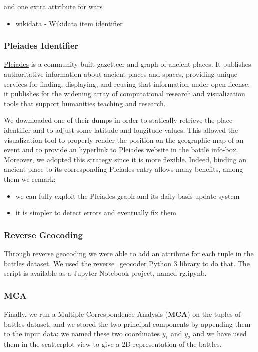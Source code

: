 and one extra attribute for wars
\begin{itemize}
    \item wikidata - Wikidata item identifier
\end{itemize}

\subsubsection{Pleiades Identifier}
\href{https://pleiades.stoa.org}{Pleiades} is a community-built gazetteer and graph of ancient places. It publishes authoritative information about ancient places and spaces, providing unique services for finding, displaying, and reusing that information under open license: it publishes for the widening array of computational research and visualization tools that support humanities teaching and research.

We downloaded one of their dumps in order to statically retrieve the place identifier and to adjust some latitude and longitude values. This allowed the visualization tool to properly render the position on the geographic map of an event and to provide an hyperlink to Pleiades website in the battle info-box. Moreover, we adopted this strategy since it is more flexible. Indeed, binding an ancient place to its corresponding Pleiades entry allows many benefits, among them we remark:
\begin{itemize}
    \item we can fully exploit the Pleiades graph and its daily-basis update system
    \item it is simpler to detect errors and eventually fix them
\end{itemize}

\subsubsection{Reverse Geocoding}
Through reverse geocoding we were able to add an attribute for each tuple in the battles dataset. We used the \href{https://pypi.org/project/reverse_geocoder/}{reverse\_geocoder} Python 3 library to do that. The script is available as a Jupyter Notebook project, named rg.ipynb.

\subsubsection{MCA}
Finally, we run a Multiple Correspondence Analysis (\textbf{MCA}) \cite{HD07} on the tuples of battles dataset, and we stored the two principal components by appending them to the input data: we named these two coordinates $y_1$ and $y_2$ and we have used them in the scatterplot view to give a 2D representation of the battles.

